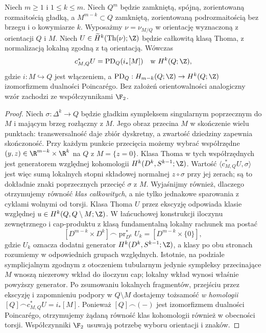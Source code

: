 \begin{twierdzenie}
\label{thm:pt-pd-v9}
Niech $m\ge1$ i $1\le k\le m$.
Niech $Q^m$ będzie zamkniętą, spójną, zorientowaną
rozmaitością gładką, a $M^{m-k}\subset Q$ zamkniętą,
zorientowaną podrozmaitością bez brzegu i o kowymiarze
$k$. Wyposażmy $\nu=\nu_{M/Q}$ w orientację
wyznaczoną z orientacji $Q$ i $M$.
Niech $U\in\widetilde H^k(\operatorname{Th}(\nu);\Z)$
będzie całkowitą klasą Thoma, z normalizacją lokalną
zgodną z tą orientacją. Wówczas
\[
c_{M,Q}^*U=\operatorname{PD}_Q(i_*[M])
\quad\text{w }H^k(Q;\Z),
\]
gdzie $i:M\hookrightarrow Q$ jest włączeniem, a
$\operatorname{PD}_Q:H_{m-k}(Q;\Z)\to H^k(Q;\Z)$
izomorfizmem dualności Poincarégo.
Bez założeń orientowalności analogiczny wzór zachodzi
ze współczynnikami $\F_2$.
\end{twierdzenie}
\begin{proof}
Niech $\sigma:\Delta^k\to Q$ będzie gładkim
sympleksem singularnym poprzecznym do $M$ i mającym
brzeg rozłączny z $M$. Jego obraz przecina $M$ w
skończenie wielu punktach: transwersalność daje
zbiór dyskretny, a zwartość dziedziny zapewnia
skończoność. Przy każdym punkcie przecięcia możemy
wybrać współrzędne $(y,z)\in\R^{m-k}\times\R^k$
na $Q$ z $M=\{z=0\}$. Klasa Thoma w tych
współrzędnych jest generatorem względnej kohomologii
$H^k(D^k,S^{k-1};\Z)$. Wartość
$\langle c_{M,Q}^*U,\sigma\rangle$ jest więc
sumą lokalnych stopni składowej normalnej
$z\circ\sigma$ przy jej zerach; są to dokładnie
znaki poprzecznych przecięć $\sigma$ z $M$.
Wyjaśnijmy również, dlaczego otrzymujemy równość
\emph{klas całkowitych}, a nie tylko jednakowe
sparowania z cyklami wolnymi od torsji. Klasa Thoma $U$
przez ekscyzję odpowiada klasie względnej
$u\in H^k(Q,Q\setminus M;\Z)$. W łańcuchowej
konstrukcji iloczynu zewnętrznego i cap-produktu
z klasą fundamentalną lokalny rachunek ma postać
\[
[D^{m-k}\times D^k]\frown
\operatorname{pr}_{D^k}^*U_k
=[D^{m-k}\times\{0\}],
\]
gdzie $U_k$ oznacza dodatni generator
$H^k(D^k,S^{k-1};\Z)$, a klasy po obu stronach
rozumiemy w odpowiednich grupach względnych.
Istotnie, na podziale symplicjalnym zgodnym z
otoczeniem tubularnym jedynie sympleksy przecinające
$M$ wnoszą niezerowy wkład do iloczynu cap;
lokalny wkład wynosi właśnie powyższy generator.
Po zsumowaniu lokalnych fragmentów, przejściu przez
ekscyzję i zapomnieniu podpory w $Q\setminus M$
dostajemy tożsamość \emph{w homologii}
$[Q]\frown c_{M,Q}^*U=i_*[M]$.
Ponieważ $[Q]\frown(-)$ jest izomorfizmem dualności
Poincarégo, otrzymujemy żądaną równość klas
kohomologii również w obecności torsji. Współczynniki
$\F_2$ usuwają potrzebę wyboru orientacji i znaków.
\end{proof}

